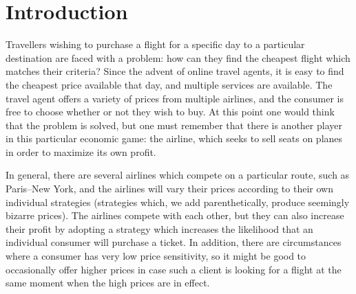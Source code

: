 \documentclass{article}
\title{\thetitle{}}
\author{\theauthors{}}
\begin{document}
\maketitle

\begin{abstract}
  We report on the \emph{Semaines d'Etude Maths-Entreprises} OptionWay
  (\url{https://www.optionway.com}) project.  OptionWay is an online
  travel agent which allows clients to buy flights for cheaper by
  taking into account the stochasticity of flight price over time.  In
  order help clients make useful decisions, they offer an estimate of
  how likely an asking price is likely to be realiastic.  The
  objectives for the workshop were to test this estimator, and, if
  time permits, to improve this estimator.  We show that the estimator
  is overly optimistic and show early work on developing an
  alternative.
\end{abstract}

\section{Introduction}

Travellers wishing to purchase a flight for a specific day to a
particular destination are faced with a problem: how can they find the
cheapest flight which matches their criteria?  Since the advent of
online travel agents, it is easy to find the cheapest price available
that day, and multiple services are available.  The travel agent
offers a variety of prices from multiple airlines, and the consumer is
free to choose whether or not they wish to buy.  At this point one
would think that the problem is solved, but one must remember that
there is another player in this particular economic game: the airline,
which seeks to sell seats on planes in order to maximize its own
profit.

In general, there are several airlines which compete on a particular
route, such as Paris--New York, and the airlines will vary their prices
according to their own individual strategies (strategies which, we add
parenthetically, produce seemingly bizarre prices).  The airlines
compete with each other, but they can also increase their profit by
adopting a strategy which increases the likelihood that an individual
consumer will purchase a ticket.  In addition, there are circumstances
where a consumer has very low price sensitivity, so it might be good
to occasionally offer higher prices in case such a client is looking
for a flight at the same moment when the high prices are in effect.
\end{document}
